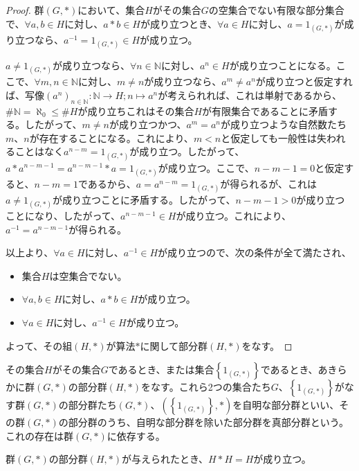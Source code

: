 \documentclass[dvipdfmx]{jsarticle}
\begin{document}
\begin{proof}
群$(G,*)$において、集合$H$がその集合$G$の空集合でない有限な部分集合で、$\forall a,b \in H$に対し、$a*b \in H$が成り立つとき、$\forall a \in H$に対し、$a = 1_{(G,*)}$が成り立つなら、$a^{- 1} = 1_{(G,*)} \in H$が成り立つ。\par
$a \neq 1_{(G,*)}$が成り立つなら、$\forall n \in \mathbb{N}$に対し、$a^{n} \in H$が成り立つことになる。ここで、$\forall m,n \in \mathbb{N}$に対し、$m \neq n$が成り立つなら、$a^{m} \neq a^{n}$が成り立つと仮定すれば、写像$\left( a^{n} \right)_{n \in \mathbb{N}}:\mathbb{N} \rightarrow H;n \mapsto a^{n}$が考えられれば、これは単射であるから、$\#\mathbb{N} = \aleph_{0} \leq \#H$が成り立ちこれはその集合$H$が有限集合であることに矛盾する。したがって、$m \neq n$が成り立つかつ、$a^{m} = a^{n}$が成り立つような自然数たち$m$、$n$が存在することになる。これにより、$m < n$と仮定しても一般性は失われることはなく$a^{n - m} = 1_{(G,*)}$が成り立つ。したがって、$a*a^{n - m - 1} = a^{n - m - 1}*a = 1_{(G,*)}$が成り立つ。ここで、$n - m - 1 = 0$と仮定すると、$n - m = 1$であるから、$a = a^{n - m} = 1_{(G,*)}$が得られるが、これは$a \neq 1_{(G,*)}$が成り立つことに矛盾する。したがって、$n - m - 1 > 0$が成り立つことになり、したがって、$a^{n - m - 1} \in H$が成り立つ。これにより、$a^{- 1} = a^{n - m - 1}$が得られる。\par
以上より、$\forall a \in H$に対し、$a^{- 1} \in H$が成り立つので、次の条件が全て満たされ、
\begin{itemize}
\item
  集合$H$は空集合でない。
\item
  $\forall a,b \in H$に対し、$a*b \in H$が成り立つ。
\item
  $\forall a \in H$に対し、$a^{- 1} \in H$が成り立つ。
\end{itemize}
よって、その組$(H,*)$が算法$*$に関して部分群$(H,*)$をなす。
\end{proof}
\begin{dfn}
その集合$H$がその集合$G$であるとき、または集合$\left\{ 1_{(G,*)} \right\}$であるとき、あきらかに群$(G,*)$の部分群$(H,*)$をなす。これら2つの集合たち$G$、$\left\{ 1_{(G,*)} \right\}$がなす群$(G,*)$の部分群たち$(G,*)$、$\left( \left\{ 1_{(G,*)} \right\},* \right)$を自明な部分群といい、その群$(G,*)$の部分群のうち、自明な部分群を除いた部分群を真部分群という。これの存在は群$(G,*)$に依存する。
\end{dfn}
\begin{thm}\label{3.1.1.9}
群$(G,*)$の部分群$(H,*)$が与えられたとき、$H*H = H$が成り立つ。
\end{thm}
\end{document}
